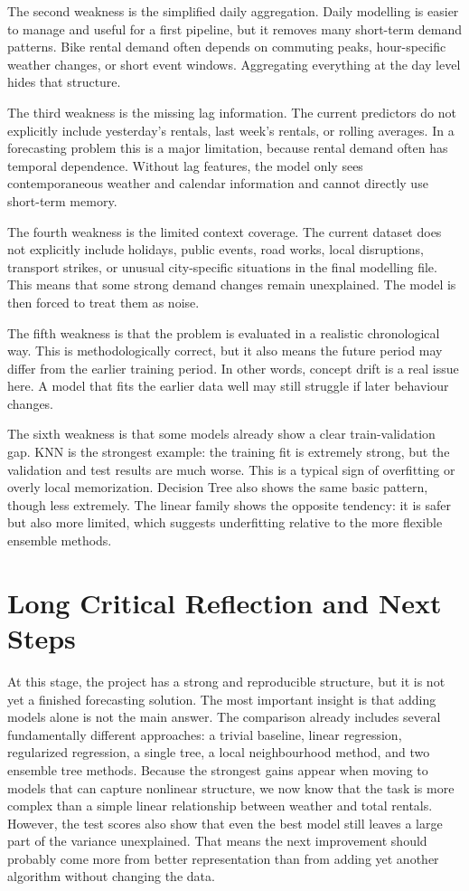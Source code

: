 \documentclass[conference]{IEEEtran}
\begin{document}
The second weakness is the simplified daily aggregation. Daily modelling is easier to manage and useful
for a first pipeline, but it removes many short-term demand patterns. Bike rental demand often depends
on commuting peaks, hour-specific weather changes, or short event windows. Aggregating everything at
the day level hides that structure.

The third weakness is the missing lag information. The current predictors do not explicitly include 
yesterday's rentals, last week's rentals, or rolling averages. In a forecasting problem this is a major 
limitation, because rental demand often has temporal dependence. Without lag features, the model only 
sees contemporaneous weather and calendar information and cannot directly use short-term memory.

The fourth weakness is the limited context coverage. The current dataset does not explicitly include 
holidays, public events, road works, local disruptions, transport strikes, or unusual city-specific 
situations in the final modelling file. This means that some strong demand changes remain unexplained. 
The model is then forced to treat them as noise.

The fifth weakness is that the problem is evaluated in a realistic chronological way. This is 
methodologically correct, but it also means the future period may differ from the earlier training 
period. In other words, concept drift is a real issue here. A model that fits the earlier data well 
may still struggle if later behaviour changes.

The sixth weakness is that some models already show a clear train-validation gap. KNN is the strongest 
example: the training fit is extremely strong, but the validation and test results are much worse. 
This is a typical sign of overfitting or overly local memorization. Decision Tree also shows the same 
basic pattern, though less extremely. The linear family shows the opposite tendency: it is safer but 
also more limited, which suggests underfitting relative to the more flexible ensemble methods.

\section{Long Critical Reflection and Next Steps}
At this stage, the project has a strong and reproducible structure, but it is not yet a finished
 forecasting solution. The most important insight is that adding models alone is not the main answer. 
 The comparison already includes several fundamentally different approaches: a trivial baseline, linear 
 regression, regularized regression, a single tree, a local neighbourhood method, and two ensemble tree 
 methods. Because the strongest gains appear when moving to models that can capture nonlinear structure, 
 we now know that the task is more complex than a simple linear relationship between weather and total 
 rentals. However, the test scores also show that even the best model still leaves a large part of the 
 variance unexplained. That means the next improvement should probably come more from better 
 representation than from adding yet another algorithm without changing the data.
\end{document}
